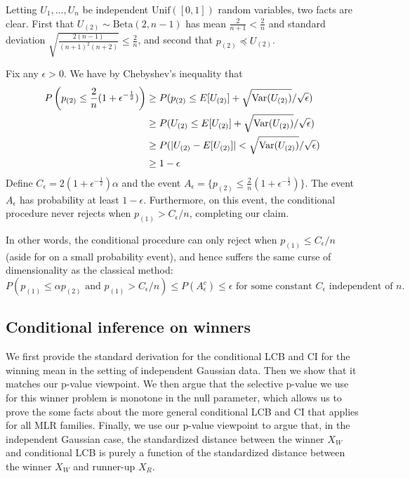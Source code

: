 \documentclass{article}
\newcommand{\Var}{\textup{Var}}
\begin{document}
\begin{appendix}
Letting $U_1, \dots, U_n$ be independent $\text{Unif}([0, 1])$ random variables, two facts are clear. First that $U_{(2)} \sim \text{Beta}(2, n-1)$ has mean $\frac{2}{n + 1} < \frac{2}{n}$ and standard deviation $\sqrt{\frac{2(n-1)}{(n+1)^2(n+2)}} \leq \frac{2}{n}$, and second that $p_{(2)} \preceq U_{(2)}$. 

Fix any $\epsilon > 0$. We have by Chebyshev's inequality that  
\begin{align*}
    P\left(p_{(2)} \leq \frac{2}{n}(1 + \epsilon^{-\frac{1}{2}})\right) &\geq P(p_{(2)} \leq E[U_{(2)}] + \sqrt{\Var(U_{(2)})}/\sqrt{\epsilon})\\
    &\geq P(U_{(2)} \leq E[U_{(2)}] + \sqrt{\Var(U_{(2)})}/\sqrt{\epsilon})\\
    &\geq P(|U_{(2)} - E[U_{(2)}]| < \sqrt{\Var(U_{(2)})}/\sqrt{\epsilon} ) \\
    &\geq 1 - \epsilon
\end{align*}
Define $C_{\epsilon} = 2(1 + \epsilon^{-\frac{1}{2}})\alpha$ and the event $A_{\epsilon} = \{ p_{(2)} \leq \frac{2}{n}(1 + \epsilon^{-\frac{1}{2}})\}$. The event $A_{\epsilon}$ has probability at least $1-\epsilon$. Furthermore, on this event, the conditional procedure never rejects when $p_{(1)} > C_{\epsilon}/n$, completing our claim. 

In other words, the conditional procedure can only reject when $p_{(1)} \leq C_{\epsilon}/n$ (aside for on a small probability event), and hence suffers the same curse of dimensionality as the classical method:
\begin{equation*}
    P(p_{(1)} \leq \alpha p_{(2)} \text{ and } p_{(1)} > C_{\epsilon}/n) \leq P(A_{\epsilon}^c) \leq \epsilon \text{ for some constant } C_{\epsilon} \text{ independent of } n.  
\end{equation*}


\subsection{Conditional inference on winners}
\label{sec:cond_appdx}

We first provide the standard derivation for the conditional LCB and CI for the winning mean in the setting of independent Gaussian data. Then we show that it matches our p-value viewpoint. We then argue that the selective p-value we use for this winner problem is monotone in the null parameter, which allows us to prove the some facts about the more general conditional LCB and CI that applies for all MLR families. Finally, we use our p-value viewpoint to argue that, in the independent Gaussian case, the standardized distance between the winner $X_W$ and conditional LCB is purely a function of the standardized distance between the winner $X_W$ and runner-up $X_R$. 


\end{appendix}
\end{document}
